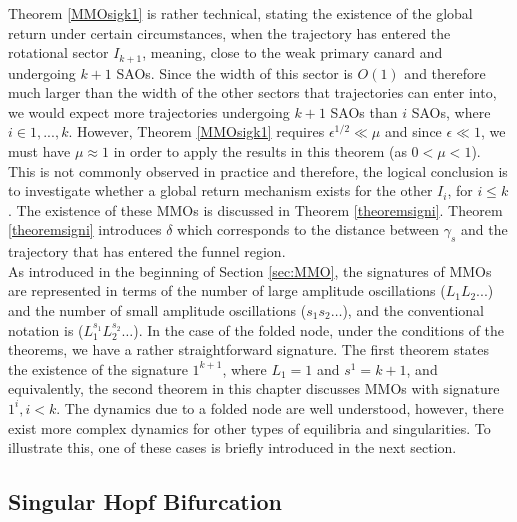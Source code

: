 Theorem \ref{MMOsigk1} is rather technical, stating the existence of the global return under certain circumstances, when the trajectory has entered the rotational sector $I_{k+1}$, meaning, close to the weak primary canard and undergoing $k+1$ SAOs. Since the width of this sector is $O(1)$ and therefore much larger than the width of the other sectors that trajectories can enter into, we would expect more trajectories undergoing $k+1$ SAOs than $i$ SAOs, where $i \in 1,...,k$.
However, Theorem \ref{MMOsigk1} requires $\epsilon^{1/2} \ll \mu$ and since $\epsilon \ll 1$, we must have $\mu \approx 1$ in order to apply the results in this theorem (as $0<\mu<1$). This is not commonly observed in practice and therefore, the logical conclusion is to investigate whether a global return mechanism exists for the other $I_i$, for $i \leq k$. The existence of these MMOs is discussed in Theorem \ref{theoremsigni}. Theorem \ref{theoremsigni} introduces $\delta$ which corresponds to the distance between $\gamma_s$ and the trajectory that has entered the funnel region.\\

As introduced in the beginning of Section \ref{sec:MMO},  the signatures of MMOs are represented in terms of the number of large amplitude oscillations ($L_1L_2...$) and the number of small amplitude oscillations ($s_1s_2\ldots$), and the conventional notation is ($L_1^{s_1}L_2^{s_2}\ldots$).
In the case of the folded node, under the conditions of the theorems, we have a rather straightforward signature. The first theorem states the existence of the signature $1^{k+1}$, where $L_1=1$ and $s^1=k+1$, and equivalently, the second theorem in this chapter discusses MMOs with signature $1^{i}, i<k$.
The dynamics due to a folded node are well understood, however, there exist more complex dynamics for other types of equilibria and singularities.
To illustrate this, one of these cases is briefly introduced in the next section.


\subsection{Singular Hopf Bifurcation}

